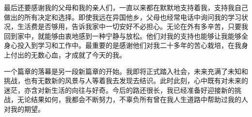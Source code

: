 \begin{theacknowledgements}
最后还要感谢我的父母和我的亲人们，一直以来都在默默地支持着我，支持我自己做出的所有决定和选择。即使我远在异国他乡，父母也经常电话中询问我的学习状况，生活费是否够用，告诉我家中一切安好不必担心。无论在外有多辛苦，只要我回到家中，就能够由衷地感到一种宁静与放松。他们对我的支持也能够让我能够全身心投入到学习和工作中。最重要的是感谢他们对我二十多年的苦心栽培，在我身上付出的无数心血，才成就了今天的我。

一个篇章的落幕是另一段新篇章的开始。我即将正式踏入社会，未来充满了未知和挑战，也有无数新的风景与人等着我去发现去结识。此时此刻，心中既有对未来的迷茫，亦含对新生活的向往与好奇。今后的路还很长，我已经准备好迎接新的挑战，无论结果如何，我都会不断努力，不辜负所有曾在我人生道路中帮助过我的人对我的期望。

\end{theacknowledgements}





